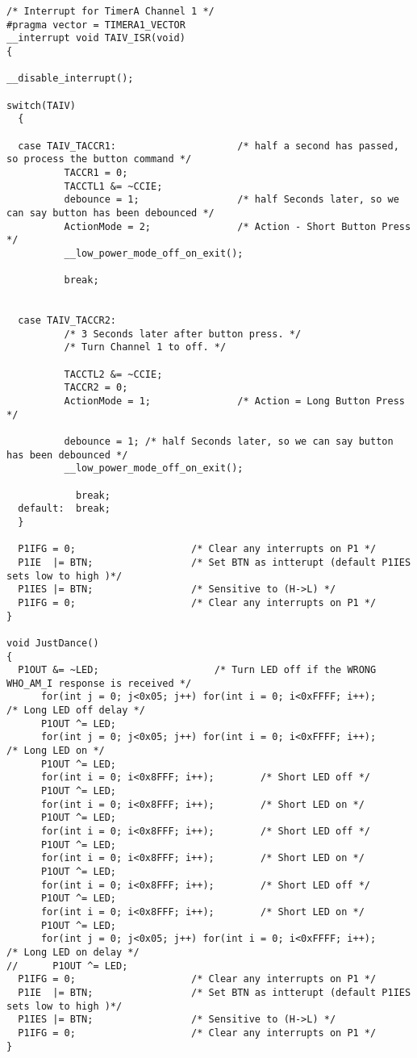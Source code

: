 \begin{lstlisting}[caption=Main.c,label=Code4]
/* Interrupt for TimerA Channel 1 */
#pragma vector = TIMERA1_VECTOR
__interrupt void TAIV_ISR(void)
{
  
__disable_interrupt();    
  
switch(TAIV)
  {
  
  case TAIV_TACCR1:                     /* half a second has passed, so process the button command */
          TACCR1 = 0;
          TACCTL1 &= ~CCIE;
          debounce = 1;                 /* half Seconds later, so we can say button has been debounced */
          ActionMode = 2;               /* Action - Short Button Press */ 
          __low_power_mode_off_on_exit();
                 
          break;
          
          
  case TAIV_TACCR2:
          /* 3 Seconds later after button press. */
          /* Turn Channel 1 to off. */
          
          TACCTL2 &= ~CCIE;
          TACCR2 = 0;
          ActionMode = 1;               /* Action = Long Button Press */

          debounce = 1; /* half Seconds later, so we can say button has been debounced */
          __low_power_mode_off_on_exit();
          
            break;
  default:  break; 
  }
 
  P1IFG = 0;                    /* Clear any interrupts on P1 */
  P1IE  |= BTN;                 /* Set BTN as intterupt (default P1IES sets low to high )*/
  P1IES |= BTN;                 /* Sensitive to (H->L) */
  P1IFG = 0;                    /* Clear any interrupts on P1 */
}

void JustDance()
{
  P1OUT &= ~LED;                    /* Turn LED off if the WRONG WHO_AM_I response is received */
      for(int j = 0; j<0x05; j++) for(int i = 0; i<0xFFFF; i++);        /* Long LED off delay */
      P1OUT ^= LED;
      for(int j = 0; j<0x05; j++) for(int i = 0; i<0xFFFF; i++);        /* Long LED on */
      P1OUT ^= LED;
      for(int i = 0; i<0x8FFF; i++);        /* Short LED off */
      P1OUT ^= LED;
      for(int i = 0; i<0x8FFF; i++);        /* Short LED on */
      P1OUT ^= LED;
      for(int i = 0; i<0x8FFF; i++);        /* Short LED off */
      P1OUT ^= LED;
      for(int i = 0; i<0x8FFF; i++);        /* Short LED on */
      P1OUT ^= LED;
      for(int i = 0; i<0x8FFF; i++);        /* Short LED off */
      P1OUT ^= LED;
      for(int i = 0; i<0x8FFF; i++);        /* Short LED on */
      P1OUT ^= LED;
      for(int j = 0; j<0x05; j++) for(int i = 0; i<0xFFFF; i++);        /* Long LED on delay */
//      P1OUT ^= LED;                                                     
  P1IFG = 0;                    /* Clear any interrupts on P1 */
  P1IE  |= BTN;                 /* Set BTN as intterupt (default P1IES sets low to high )*/
  P1IES |= BTN;                 /* Sensitive to (H->L) */
  P1IFG = 0;                    /* Clear any interrupts on P1 */
}


\end{lstlisting}
